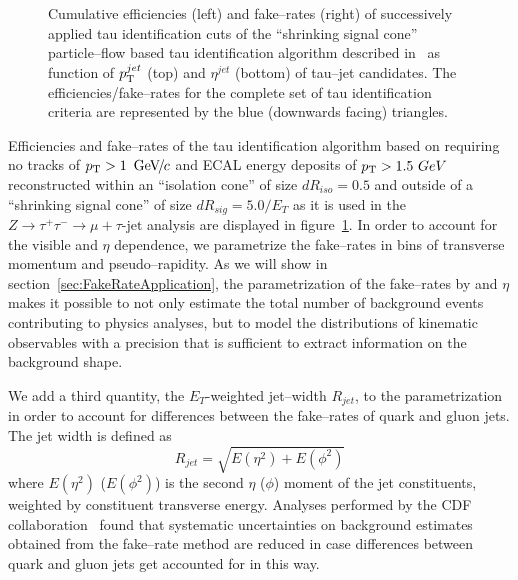 \begin{figure}[t]
\begin{center}
\begin{picture}
\end{picture}
\caption[$\pt$ and $\eta$ dependency of tau ID performance]{Cumulative
efficiencies (left) and fake--rates (right) of successively applied tau
identification cuts of the ``shrinking signal cone'' particle--flow based tau
identification algorithm described in~\cite{CMS-PAS-PFT-08-001} as function of
$\pt^{jet}$ (top) and $\eta^{jet}$ (bottom) of tau--jet candidates.  The
efficiencies/fake--rates for the complete set of tau identification criteria are
represented by the blue (downwards facing) triangles.}
\label{figPFTauReco_EfficienciesAndFakeRates}
\end{center}
\end{figure} 

Efficiencies and fake--rates of the tau identification algorithm based on
requiring no tracks of $\pt > 1~\GeVc$ and ECAL energy deposits of $\pt >
1.5~GeV$ reconstructed within an ``isolation cone'' of size $dR_{iso} = 0.5$ and
outside of a ``shrinking signal cone'' of size $dR_{sig} = 5.0 / E_{T}$ as it is
used in the $Z \rightarrow \tau^{+} \tau^{-} \rightarrow \mu + \tau\mbox{-jet}$
analysis are displayed in figure~\ref{figPFTauReco_EfficienciesAndFakeRates}.
In order to account for the visible \pt and $\eta$ dependence, we
parametrize the fake--rates in bins of transverse momentum and pseudo--rapidity.
As we will show in section~\ref{sec:FakeRateApplication}, the parametrization of
the fake--rates by \pt and $\eta$ makes it possible to not only estimate the
total number of background events contributing to physics analyses, but to model
the distributions of kinematic observables with a precision that is sufficient
to extract information on the background shape.

We add a third quantity, the $E_{T}$-weighted jet--width $R_{jet}$, to the
parametrization in order to account for differences between the fake--rates of
quark and gluon jets.  The jet width is defined as 
\begin{equation}
R_{jet} = \sqrt{E \left( \eta^2 \right) + E \left( \phi^2 \right)}
\end{equation}
where $E \left( \eta^2 \right)$ ($E \left( \phi^2 \right)$) is the second $\eta$
($\phi$) moment of the jet constituents, weighted by constituent transverse
energy. Analyses performed by the CDF collaboration~\cite{CDFMSSMHiggs,
CDFFakerateDJang, CDFFakerateAlmenar}
found that systematic uncertainties on background estimates obtained from the
fake--rate method are reduced in case differences between quark and gluon jets
get accounted for in this way.

